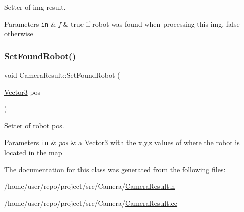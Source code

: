 Setter of img result. 


\begin{DoxyParams}[1]{Parameters}
\mbox{\tt in}  & {\em f} & true if robot was found when processing this img, false otherwise \\
\hline
\end{DoxyParams}
\mbox{\label{classCameraResult_a669e85149ff4bf617c136afa57577bbf}} 
\subsubsection{\texorpdfstring{Set\+Found\+Robot()}{SetFoundRobot()}\hspace{0.1cm}{\footnotesize\ttfamily [2/2]}}
{\footnotesize\ttfamily void Camera\+Result\+::\+Set\+Found\+Robot (\begin{DoxyParamCaption}\item[{\hyperlink{classVector3}{Vector3}}]{pos }\end{DoxyParamCaption})}



Setter of robot pos. 


\begin{DoxyParams}[1]{Parameters}
\mbox{\tt in}  & {\em pos} & a \hyperlink{classVector3}{Vector3} with the x,y,z values of where the robot is located in the map \\
\hline
\end{DoxyParams}


The documentation for this class was generated from the following files\+:\begin{DoxyCompactItemize}
\item 
/home/user/repo/project/src/\+Camera/\hyperlink{CameraResult_8h}{Camera\+Result.\+h}\item 
/home/user/repo/project/src/\+Camera/\hyperlink{CameraResult_8cc}{Camera\+Result.\+cc}\end{DoxyCompactItemize}
